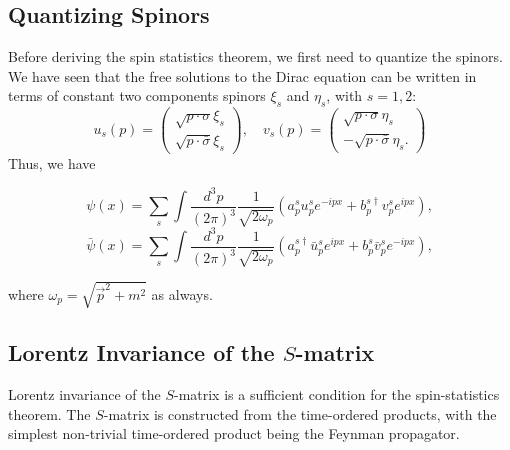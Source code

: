 \documentclass[11pt]{article}
\theoremstyle{definition}
\begin{document}
\subsection{Quantizing Spinors}
Before deriving the spin statistics theorem, we first need to quantize the spinors. We have seen that the free solutions to the Dirac equation can be written in terms of constant two components spinors $\xi_s$ and $\eta_s$, with $s=1,2$:
\begin{equation}
    u_s(p)=
    \begin{pmatrix}
        \sqrt{p\cdot \sigma}\xi_s \\ \sqrt{p\cdot \bar{\sigma}}\xi_s
    \end{pmatrix},\quad
    v_s(p)=
    \begin{pmatrix}
        \sqrt{p\cdot \sigma}\eta_s \\ -\sqrt{p\cdot \bar{\sigma}}\eta_s.
    \end{pmatrix}
\end{equation}
Thus, we have
\begin{shaded}
\begin{equation}
\psi(x) = \sum_{s}\int\frac{d^{3}p}{(2\pi)^{3}}\frac{1}{\sqrt{2\omega_{p}}}\left(a_{p}^{s}u_{p}^{s}e^{-ipx}+b_{p}^{s\dagger}v_{p}^{s}e^{ipx}\right),
\end{equation}
\begin{equation}
\bar{\psi}(x) = \sum_{s}\int\frac{d^{3}p}{(2\pi)^{3}}\frac{1}{\sqrt{2\omega_{p}}}\left(a_{p}^{s\dagger}\bar{u}_{p}^{s}e^{ipx}+b_{p}^{s}\bar{v}_{p}^{s}e^{-ipx}\right),
\end{equation}
\end{shaded}
where $\omega_p= \sqrt{\vec{p}^2 + m^2}$ as always.

\subsection{Lorentz Invariance of the $S$-matrix}
Lorentz invariance of the $S$-matrix is a sufficient condition for the spin-statistics theorem. The $S$-matrix is constructed from the time-ordered products, with the simplest non-trivial time-ordered product being the Feynman propagator. 
\end{document}
